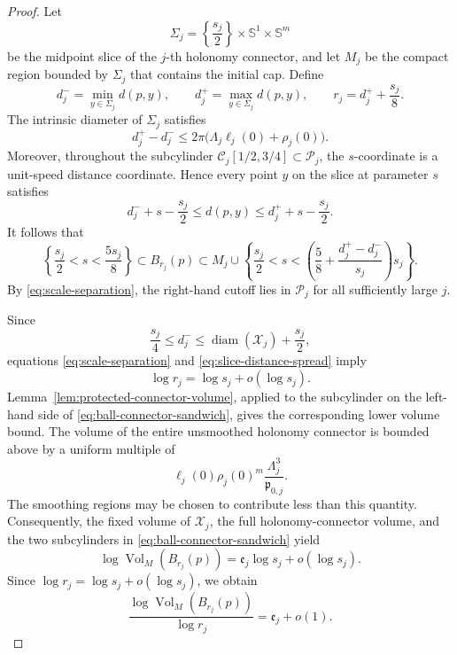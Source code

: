 \documentclass[11pt,reqno]{amsart}
\theoremstyle{definition}
\numberwithin{equation}{section}
\begin{document}
\begin{proof}
Let
\[
 \Sigma_j
 =
 \left\{\frac{s_j}{2}\right\}
 \times\mathbb S^1\times\mathbb S^m
\]
be the midpoint slice of the \(j\)-th holonomy connector, and let \(M_j\) be the
compact region bounded by \(\Sigma_j\) that contains the initial cap.
Define
\[
 d_j^-=\min_{y\in\Sigma_j}d(p,y),
 \qquad
 d_j^+=\max_{y\in\Sigma_j}d(p,y),
 \qquad
 r_j=d_j^++\frac{s_j}{8}.
\]
The intrinsic diameter of \(\Sigma_j\) satisfies
\[
 d_j^+-d_j^-
 \le
 2\pi\bigl(\Lambda_j\ell_j(0)+\rho_j(0)\bigr).
 \tag{8.25}\label{eq:slice-distance-spread}
\]
Moreover, throughout the subcylinder
$\mathcal C_j[1/2,3/4]\subset\mathcal P_j$, the $s$-coordinate is a unit-speed distance
coordinate.  Hence every point \(y\) on the slice at parameter \(s\)
satisfies
\[
 d_j^-+s-\frac{s_j}{2}
 \le d(p,y)
 \le d_j^++s-\frac{s_j}{2}.
 \tag{8.26}\label{eq:connector-distance-comparison}
\]
It follows that
\[
 \left\{
 \frac{s_j}{2}<s<\frac{5s_j}{8}
 \right\}
 \subset B_{r_j}(p)
 \subset
 M_j\cup
 \left\{
 \frac{s_j}{2}<s<
 \left(
 \frac58+\frac{d_j^+-d_j^-}{s_j}
 \right)s_j
 \right\}.
 \tag{8.27}\label{eq:ball-connector-sandwich}
\]
By \eqref{eq:scale-separation}, the right-hand cutoff lies in
$\mathcal P_j$ for all sufficiently large \(j\).

Since
\[
 \frac{s_j}{4}
 \le d_j^-
 \le \operatorname{diam}(\mathcal X_j)+\frac{s_j}{2},
\]
equations \eqref{eq:scale-separation} and
\eqref{eq:slice-distance-spread} imply
\[
 \log r_j=\log s_j+o(\log s_j).
\]
Lemma~\ref{lem:protected-connector-volume}, applied to the subcylinder
on the left-hand side of
\eqref{eq:ball-connector-sandwich}, gives the corresponding lower volume
bound.  The volume of the entire unsmoothed holonomy connector is bounded above
by a uniform multiple of
\[
 \ell_j(0)\rho_j(0)^m
 \frac{\Lambda_j^3}{\mathfrak p_{0,j}}.
\]
The smoothing regions may be chosen to contribute less than this
quantity.  Consequently, the fixed volume of \(\mathcal X_j\), the full
holonomy-connector volume, and the two subcylinders in
\eqref{eq:ball-connector-sandwich} yield
\[
 \log\operatorname{Vol}_M(B_{r_j}(p))
 =
 \mathfrak e_j\log s_j+o(\log s_j).
\]
Since \(\log r_j=\log s_j+o(\log s_j)\), we obtain
\[
 \frac{\log\operatorname{Vol}_M(B_{r_j}(p))}
 {\log r_j}
 =\mathfrak e_j+o(1).
\]


\end{proof}
\end{document}
